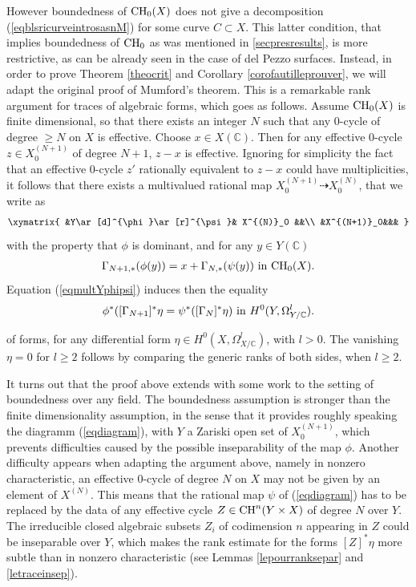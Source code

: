 \documentclass[10pt]{article}
\begin{document}
However boundedness of ${\rm CH}_0(X)$  does not give a decomposition (\ref{eqblsricurveintrosasnM}) for some  curve $C\subset X$. This latter condition, that implies boundedness of ${\rm CH}_0$ as was mentioned in  \ref{secpresresults}, is more restrictive, as  can be  already seen in the case of del Pezzo surfaces. Instead, in order to prove Theorem \ref{theocrit} and Corollary \ref{corofautilleprouver}, we will adapt the original proof of Mumford's theorem. This  is a remarkable rank argument for traces of algebraic forms, which goes as follows. Assume ${\rm CH}_0(X)$ is finite dimensional, so that there exists an integer $N$ such that any $0$-cycle of degree $\geq N$ on $X$ is effective. Choose $x\in X(\mathbb{C})$. Then for any effective  $0$-cycle $ z\in X^{(N+1)}_0$ of degree $N+1$, $z-x$ is effective. Ignoring for simplicity the fact that an effective $0$-cycle $z'$ rationally equivalent to $z-x$ could have multiplicities, it  follows that there exists a multivalued rational map $X^{(N+1)}_0\dashrightarrow X^{(N)}_0$, that we write as
 \begin{eqnarray}\label{eqdiagram}\xymatrix{
&Y\ar[d]^{\phi}\ar[r]^{\psi}& X^{(N)}_0 &&\\
&X^{(N+1)}_0&&&
}
 \end{eqnarray}
 with the property that $\phi$ is dominant, and for any $y\in Y(\mathbb{C})$
 \begin{eqnarray}\label{eqmultYphipsi}\Gamma_{N+1,*}(\phi(y))=x+ \Gamma_{N,*}(\psi(y))\,\,{\rm in}\,\,{\rm CH}_0(X).
 \end{eqnarray}
 Equation (\ref{eqmultYphipsi}) induces then the equality
 \begin{eqnarray}\label{eqmeqformsrevision}\phi^*([\Gamma_{N+1}]^*\eta=\psi^*( [\Gamma_{N}]^*\eta)\,\,{\rm in}\,\,H^0(Y,\Omega_{Y/\mathbb{C}}^l).
 \end{eqnarray}

of forms, for any differential form $\eta\in H^0(X,\Omega_{X/\mathbb{C}}^l)$, with $l>0$. The vanishing $\eta=0$ for $l\geq 2$ follows by comparing the generic ranks of both sides, when $l\geq2$.

It turns out that the proof above extends with some work to the setting of boundedness over any field. The boundedness assumption is stronger than the finite dimensionality assumption, in the sense that it provides roughly speaking the diagramm (\ref{eqdiagram}), with $Y$ a Zariski open set of $X^{(N+1)}_0$, which prevents difficulties caused by the possible inseparability of the map $\phi$. Another difficulty appears when adapting the argument above, namely in nonzero characteristic, an effective $0$-cycle of degree $N$  on $X$ may not be given by an element of $X^{(N)}$. This means that the rational map $\psi $ of (\ref{eqdiagram}) has to be replaced by the data of any effective  cycle $Z\in{\rm CH}^n( Y\times X)$ of degree $N$ over $Y$. The irreducible closed algebraic subsets $Z_i$ of codimension $n$ appearing in $Z$  could be inseparable over $Y$, which makes  the rank estimate for the forms
$[Z]^*\eta$ more subtle than in nonzero characteristic (see Lemmas \ref{lepourranksepar} and \ref{letraceinsep}).
\end{document}
